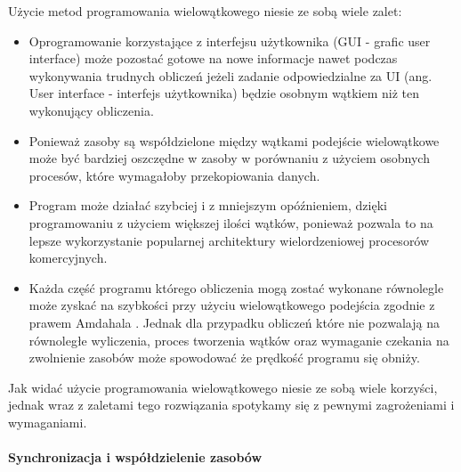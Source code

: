 Użycie metod programowania wielowątkowego niesie ze sobą wiele zalet:
\begin{itemize}
        \item Oprogramowanie korzystające z interfejsu użytkownika (GUI - grafic user interface) może pozostać gotowe na nowe informacje nawet podczas wykonywania trudnych obliczeń jeżeli zadanie odpowiedzialne za UI (ang. User interface - interfejs użytkownika) będzie osobnym wątkiem niż ten wykonujący obliczenia.
        \item Ponieważ zasoby są współdzielone między wątkami podejście wielowątkowe może być bardziej oszczędne w zasoby w porównaniu z użyciem osobnych procesów, które wymagałoby przekopiowania danych.
        \item Program może działać szybciej i z mniejszym opóźnieniem, dzięki programowaniu z użyciem większej ilości wątków, ponieważ pozwala to na lepsze wykorzystanie popularnej architektury wielordzeniowej procesorów komercyjnych. 
        \item Każda część programu którego obliczenia mogą zostać wykonane równolegle może zyskać na szybkości przy użyciu wielowątkowego podejścia zgodnie z prawem Amdahala \cite{arch}. 
        Jednak dla przypadku obliczeń które nie pozwalają na równoległe wyliczenia, proces tworzenia wątków oraz wymaganie czekania na zwolnienie zasobów może spowodować że prędkość programu się obniży.
\end{itemize}
Jak widać użycie programowania wielowątkowego niesie ze sobą wiele korzyści,
jednak wraz z zaletami tego rozwiązania spotykamy się z pewnymi zagrożeniami i wymaganiami.

\paragraph{Synchronizacja i współdzielenie zasobów}

